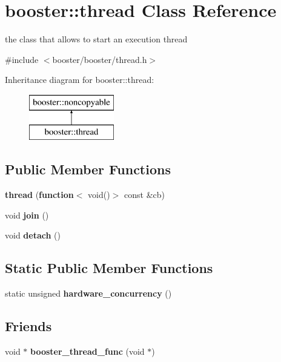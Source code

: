 \section{booster\+:\+:thread Class Reference}
\label{classbooster_1_1thread}


the class that allows to start an execution thread  




{\ttfamily \#include $<$booster/booster/thread.\+h$>$}

Inheritance diagram for booster\+:\+:thread\+:\begin{figure}[H]
\begin{center}
\leavevmode
\includegraphics[height=2.000000cm]{classbooster_1_1thread}
\end{center}
\end{figure}
\subsection*{Public Member Functions}
\begin{DoxyCompactItemize}
\item 
{\bf thread} ({\bf function}$<$ void()$>$ const \&cb)
\item 
void {\bf join} ()
\item 
void {\bf detach} ()
\end{DoxyCompactItemize}
\subsection*{Static Public Member Functions}
\begin{DoxyCompactItemize}
\item 
static unsigned {\bf hardware\+\_\+concurrency} ()
\end{DoxyCompactItemize}
\subsection*{Friends}
\begin{DoxyCompactItemize}
\item 
void $\ast$ {\bfseries booster\+\_\+thread\+\_\+func} (void $\ast$)\label{classbooster_1_1thread_a43f901dbff4f76ecba6c6903170ac7c5}

\end{DoxyCompactItemize}


